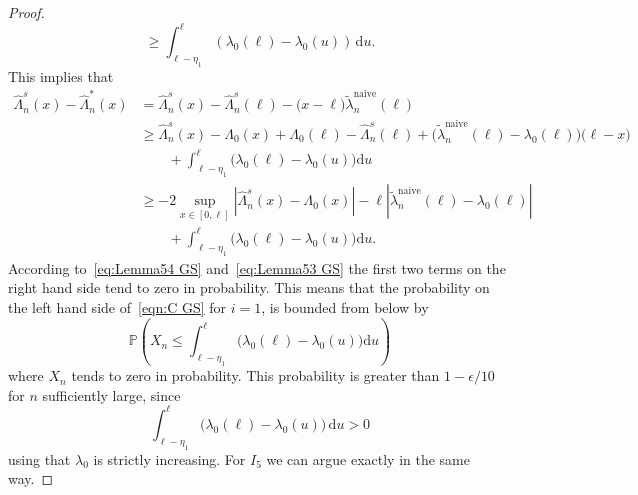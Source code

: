\documentclass[11pt,reqno]{amsart}
\theoremstyle{definition}
\theoremstyle{plain}
\theoremstyle{remark}
\begin{document}
\begin{proof}
\[\geq
\int_{\ell-\eta_1}^\ell\left(\lambda_0(\ell)-\lambda_0(u)\right)\,\mathrm{d}u.
\]
This implies that
\[
\begin{split}
\hat\Lambda_n^s(x)-\hat\Lambda_n^*(x)
&=
\hat\Lambda_n^s(x)-
\hat\Lambda_n^s(\ell)-\big(x-\ell\big)\tilde{\lambda}_n^{\mathrm{naive}}(\ell)\\
&\geq
\hat\Lambda_n^s(x)-\Lambda_0(x)+\Lambda_0(\ell)-\hat\Lambda_n^s(\ell)+
\big(\tilde{\lambda}_n^{\mathrm{naive}}(\ell)-\lambda_0(\ell)\big)\big(\ell-x\big)\\
&\qquad+
\int_{\ell-\eta_1}^{\ell}\big(\lambda_0(\ell)-\lambda_0(u)\big)\mathrm{d}u\\
&\geq
-2\sup_{x\in[0,\ell]}|\hat\Lambda_n^s(x)-\Lambda_0(x)|
-
\ell|\tilde{\lambda}_n^{\mathrm{naive}}(\ell)-\lambda_0(\ell)|\\
&\qquad+
\int_{\ell-\eta_1}^\ell\big(\lambda_0(\ell)-\lambda_0(u)\big)\mathrm{d}u.
\end{split}
\]
According to~\eqref{eq:Lemma54 GS} and~\eqref{eq:Lemma53 GS} the first two terms on the right hand side tend to zero in probability.
This means that the probability on the left hand side of~\eqref{eqn:C GS} for $i=1$, is bounded
from below by
\[
{\mathbb{P}}
\left(
X_n\leq \int_{\ell-\eta_1}^\ell\big(\lambda_0(\ell)-\lambda_0(u)\big)\mathrm{d}u
\right)
\]
where $X_n$ tends to zero in probability.
This probability is greater than $1-\epsilon/10$ for $n$ sufficiently large, since
\[
\int_{\ell-\eta_1}^\ell\big(\lambda_0(\ell)-\lambda_0(u)\big)\,\mathrm{d}u
>0
\]
using that $\lambda_0$ is strictly increasing.
For $I_5$ we can argue exactly in the same way.
\end{proof}
\end{document}
